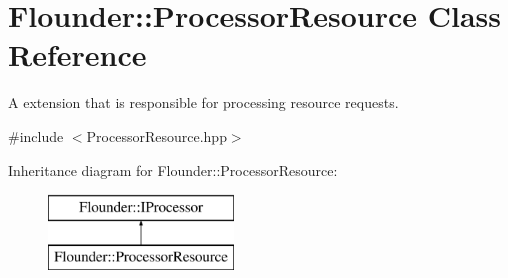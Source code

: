 \hypertarget{class_flounder_1_1_processor_resource}{}\section{Flounder\+:\+:Processor\+Resource Class Reference}
\label{class_flounder_1_1_processor_resource}


A extension that is responsible for processing resource requests.  




{\ttfamily \#include $<$Processor\+Resource.\+hpp$>$}

Inheritance diagram for Flounder\+:\+:Processor\+Resource\+:\begin{figure}[H]
\begin{center}
\leavevmode
\includegraphics[height=2.000000cm]{class_flounder_1_1_processor_resource}
\end{center}
\end{figure}
